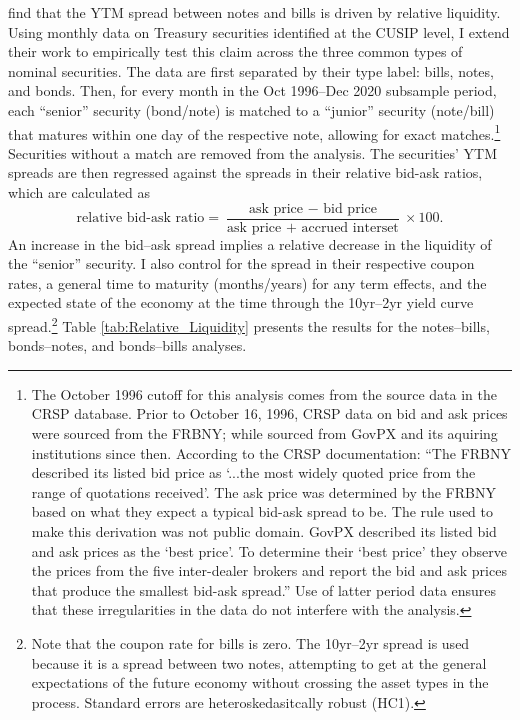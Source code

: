 \documentclass[11pt,a4paper,margin=1.5in]{article}
\begin{document}
\citet{Amihud-Mendelson:1991} find that the YTM spread between notes and bills is driven by relative liquidity.
Using monthly data on Treasury securities identified at the CUSIP level, I extend their work to empirically test this claim across the three common types of nominal securities.
The data are first separated by their type label: bills, notes, and bonds.
Then, for every month in the Oct 1996--Dec 2020 subsample period, each ``senior'' security (bond/note) is matched to a ``junior'' security (note/bill) that matures within one day of the respective note, allowing for exact matches.\footnote{
	The October 1996 cutoff for this analysis comes from the source data in the CRSP database. 
	Prior to October 16, 1996, CRSP data on bid and ask prices were sourced from the FRBNY; while sourced from GovPX and its aquiring institutions since then.
	According to the CRSP documentation: ``The FRBNY described its listed bid price as `...the most widely quoted price from the range of quotations received'. 
	The ask price was determined by the FRBNY based on what they expect a typical bid-ask spread to be. 
	The rule used to make this derivation was not public domain.
	GovPX described its listed bid and ask prices as the `best price'. To determine their `best price' they observe the prices from the five inter-dealer brokers and report the bid and ask prices that produce the smallest bid-ask spread.''
	Use of latter period data ensures that these irregularities in the data do not interfere with the analysis.
}
Securities without a match are removed from the analysis.
The securities' YTM spreads are then regressed against the spreads in their relative bid-ask ratios, which are calculated as 
$$ \text{relative bid-ask ratio} = \frac{\text{ask price }-\text{ bid price}}{\text{ask price }+\text{ accrued interset}}\times 100.$$
An increase in the bid--ask spread implies a relative decrease in the liquidity of the ``senior'' security.
I also control for the spread in their respective coupon rates, a general time to maturity (months/years) for any term effects, and the expected state of the economy at the time through the 10yr--2yr yield curve spread.\footnote{
	Note that the coupon rate for bills is zero.
	The 10yr--2yr spread is used because it is a spread between two notes, attempting to get at the general expectations of the future economy without crossing the asset types in the process. 
	Standard errors are heteroskedasitcally robust (HC1).
}
Table \ref{tab:Relative_Liquidity} presents the results for the notes--bills, bonds--notes, and bonds--bills analyses.
\end{document}
